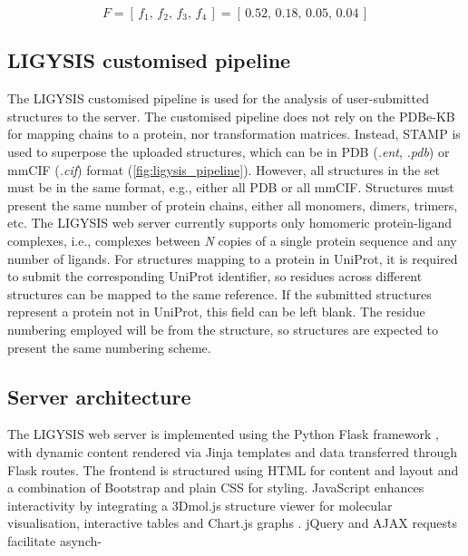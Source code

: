 \begin{equation}
F = [\,f_{1},\,f_{2},\,f_{3},\,f_{4}\,] 
    = [\,0.52,\,0.18,\,0.05,\,0.04\,]
\label{eq:func_prob_vector}
\end{equation}

\vspace{-12pt} %
\vspace{-12pt} %

\subsection{LIGYSIS customised pipeline}

The LIGYSIS customised pipeline is used for the analysis of user-submitted structures to the server. The customised pipeline does not rely on the PDBe-KB for mapping chains to a protein, nor transformation matrices. Instead, STAMP \cite{RUSSELL_1992_STAMP} is used to superpose the uploaded structures, which can be in PDB (\textit{.ent}, \textit{.pdb}) or mmCIF (\textit{.cif}) format (\autoref{fig:ligysis_pipeline}). However, all structures in the set must be in the same format, e.g., either all PDB or all mmCIF. Structures must present the same number of protein chains, either all monomers, dimers, trimers, etc. The LIGYSIS web server currently supports only homomeric protein-ligand complexes, i.e., complexes between \textit{N} copies of a single protein sequence and any number of ligands. For structures mapping to a protein in UniProt, it is required to submit the corresponding UniProt identifier, so residues across different structures can be mapped to the same reference. If the submitted structures represent a protein not in UniProt, this field can be left blank. The residue numbering employed will be from the structure, so structures are expected to present the same numbering scheme.

\subsection{Server architecture}

The LIGYSIS web server is implemented using the Python Flask framework \cite{GRINBERG_2018_FLASK}, with dynamic content rendered via Jinja templates \cite{JINJA} and data transferred through Flask routes. The frontend is structured using HTML for content and layout and a combination of Bootstrap \cite{BOOTSTRAP} and plain CSS \cite{HTML_CSS} for styling. JavaScript \cite{JAVASCRIPT} enhances interactivity by integrating a 3Dmol.js structure viewer \cite{REGO_2014_3DMOL, SESHADRI_2020_3DMOL} for molecular visualisation, interactive tables and Chart.js graphs \cite{CHARTJS}. jQuery \cite{jQUERY} and AJAX \cite{AJAX} requests facilitate asynch-

